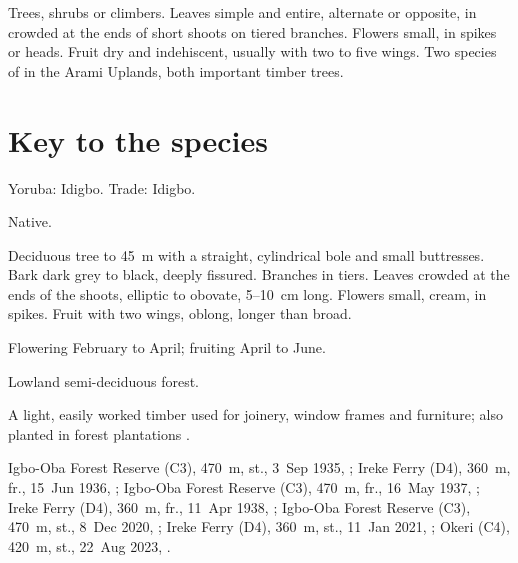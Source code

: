 \label{fam:combretaceae}

Trees, shrubs or climbers. Leaves simple and entire, alternate or
opposite, in  crowded at the ends of short shoots on
tiered branches. Flowers small, in spikes or heads. Fruit dry and
indehiscent, usually with two to five wings. Two species of
 in the Arami Uplands, both important timber trees.

\section*{Key to the species}
\begin{florakey}
\end{florakey}

\label{sp:COM01}

 Yoruba: Idigbo. Trade: Idigbo.

 Native.

 Deciduous tree to 45~m with a straight,
cylindrical bole and small buttresses. Bark dark grey to black, deeply
fissured. Branches in tiers. Leaves crowded at the ends of the shoots,
elliptic to obovate, 5--10~cm long. Flowers small, cream, in spikes.
Fruit with two wings, oblong, longer than broad.

 Flowering February to April; fruiting April to June.

 Lowland semi-deciduous forest.

 A light, easily worked timber used for joinery, window
frames and furniture; also planted in forest plantations
\citep{louppe2008}.

 Igbo-Oba Forest Reserve (C3), 470~m, st., 3~Sep 1935, ;
Ireke Ferry (D4), 360~m, fr., 15~Jun 1936, ;
Igbo-Oba Forest Reserve (C3), 470~m, fr., 16~May 1937, ;
Ireke Ferry (D4), 360~m, fr., 11~Apr 1938, ;
Igbo-Oba Forest Reserve (C3), 470~m, st., 8~Dec 2020, ;
Ireke Ferry (D4), 360~m, st., 11~Jan 2021, ;
Okeri (C4), 420~m, st., 22~Aug 2023, .

